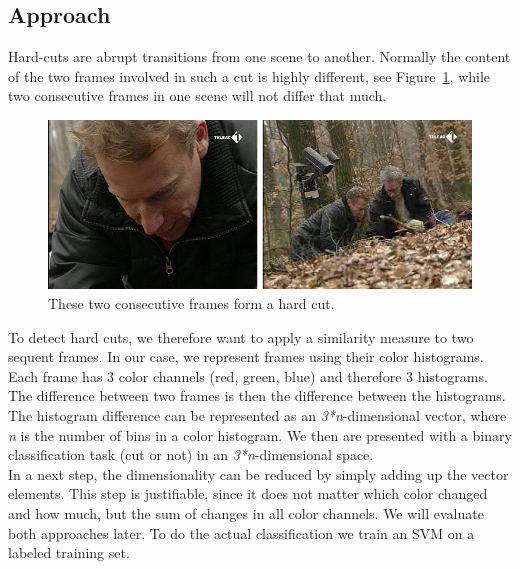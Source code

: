 \subsection{Approach}
\label{sec:hard_cut_approach}

Hard-cuts are abrupt transitions from one scene to another. 
Normally the content of the two frames involved in such a cut is highly different, see Figure~\ref{fig:hard_cut_example}, while two consecutive frames in one scene will not differ that much. 

\begin{figure}
	\centering
	\includegraphics[scale=.7]{images/hard_cut_example.png}
	\caption{These two consecutive frames form a hard cut.}
	\label{fig:hard_cut_example}
\end{figure}

To detect hard cuts, we therefore want to apply a similarity measure to two sequent frames. 
In our case, we represent frames using their color histograms. 
Each frame has 3 color channels (red, green, blue) and therefore 3 histograms.
The difference between two frames is then the difference between the histograms.
The histogram difference can be represented as an \emph{3*n}-dimensional vector, where \emph{n} is the number of bins in a color histogram. 
We then are presented with a binary classification task (cut or not) in an \emph{3*n}-dimensional space. \\
In a next step, the dimensionality can be reduced by simply adding up the vector elements. 
This step is justifiable, since it does not matter which color changed and how much, but the sum of changes in all color channels. 
We will evaluate both approaches later.
To do the actual classification we train an SVM on a labeled training set.